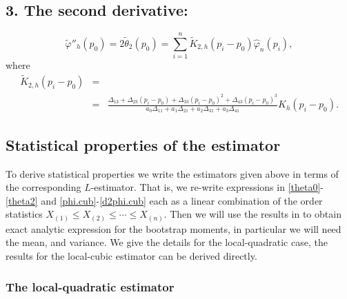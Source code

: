 \documentclass[preprint,12pt]{elsarticle}
\begin{document}
\subsection*{3. The second derivative:}%
\begin{equation}\label{d2phi.cub}
\widetilde{\varphi}''_h(p_0)= 2 \widetilde{\theta}_2(p_0)= \sum_{i=1}^n \widetilde{K}_{2,h}\left(p_i-p_0\right) \widehat{\varphi}_n\left(p_i\right),
\end{equation}
where 
\begin{eqnarray*}
\widetilde{K}_{2,h}\left(p_i-p_0\right)&=&\\
&=& \frac{\Delta_{13}+\Delta_{23}\left(p_i-p_0 \right)+\Delta_{33}\left(p_i-p_0 \right)^2+\Delta_{43}\left(p_i-p_0 \right)^3}{a_0 \Delta_{11}+ a_1 \Delta_{21}+a_2 \Delta_{31}+a_3 \Delta_{41}} K_h\left(p_i-p_0\right).
\end{eqnarray*}


\bigskip

\subsection{Statistical properties of the estimator}\label{stat_prop}

To derive statistical properties we write the estimators given above in terms of the corresponding $L$-estimator. That is, we re-write expressions in \eqref{theta0}-\eqref{theta2} and \eqref{phi.cub}-\eqref{d2phi.cub} each as a linear combination of the order statistics $X_{(1)} \leq X_{(2)} \leq \cdots \leq X_{(n)}$. Then we will use the results in \cite{HE2000} to obtain exact analytic expression for the bootstrap moments, in particular we will need the mean, and variance. 
We give the details for the local-quadratic case, the results for the local-cubic estimator can be derived directly.

\subsubsection{The local-quadratic estimator}
\end{document}
